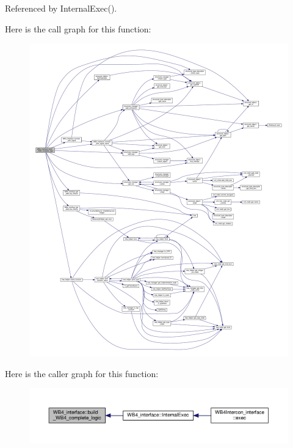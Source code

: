 Referenced by Internal\+Exec().

Here is the call graph for this function\+:
\nopagebreak
\begin{figure}[H]
\begin{center}
\leavevmode
\includegraphics[width=350pt]{d5/d7a/classWB4__interface_abd624e3f9aa8be81278be30e7099f88b_cgraph}
\end{center}
\end{figure}
Here is the caller graph for this function\+:
\nopagebreak
\begin{figure}[H]
\begin{center}
\leavevmode
\includegraphics[width=350pt]{d5/d7a/classWB4__interface_abd624e3f9aa8be81278be30e7099f88b_icgraph}
\end{center}
\end{figure}
\mbox{\label{classWB4__interface_ac4a503a75aef89a9cfd1927cccd37c6b}} 
